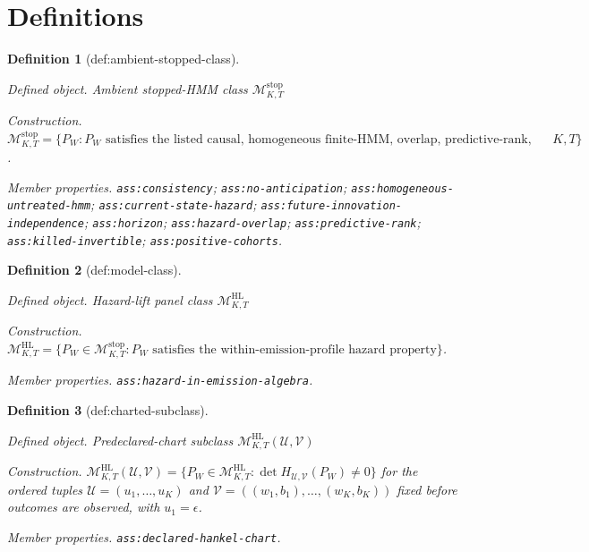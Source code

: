 \documentclass{article}
\newtheorem{definition}{Definition}
\begin{document}
\section{Definitions}

\begin{definition}[def:ambient-stopped-class]\label{def:ambient-stopped-class}
\par\smallskip\noindent\emph{Defined object.} Ambient stopped-HMM class \(\mathcal M^{\mathrm{stop}}_{K,T}\)
\par\smallskip\noindent\emph{Construction.} \(\mathcal M^{\mathrm{stop}}_{K,T}=\{P_W:P_W\text{ satisfies the listed causal, homogeneous finite-HMM, overlap, predictive-rank, killed-inverse, and cohort-support properties for the displayed }K,T\}\).
\par\smallskip\noindent\emph{Member properties.} \texttt{ass:\allowbreak{}consistency}; \texttt{ass:\allowbreak{}no-\allowbreak{}anticipation}; \texttt{ass:\allowbreak{}homogeneous-\allowbreak{}untreated-\allowbreak{}hmm}; \texttt{ass:\allowbreak{}current-\allowbreak{}state-\allowbreak{}hazard}; \texttt{ass:\allowbreak{}future-\allowbreak{}innovation-\allowbreak{}independence}; \texttt{ass:\allowbreak{}horizon}; \texttt{ass:\allowbreak{}hazard-\allowbreak{}overlap}; \texttt{ass:\allowbreak{}predictive-\allowbreak{}rank}; \texttt{ass:\allowbreak{}killed-\allowbreak{}invertible}; \texttt{ass:\allowbreak{}positive-\allowbreak{}cohorts}.
\end{definition}

\begin{definition}[def:model-class]\label{def:model-class}
\par\smallskip\noindent\emph{Defined object.} Hazard-lift panel class \(\mathcal M^{\mathrm{HL}}_{K,T}\)
\par\smallskip\noindent\emph{Construction.} \(\mathcal M^{\mathrm{HL}}_{K,T}=\{P_W\in\mathcal M^{\mathrm{stop}}_{K,T}:P_W\text{ satisfies the within-emission-profile hazard property}\}\).
\par\smallskip\noindent\emph{Member properties.} \texttt{ass:\allowbreak{}hazard-\allowbreak{}in-\allowbreak{}emission-\allowbreak{}algebra}.
\end{definition}

\begin{definition}[def:charted-subclass]\label{def:charted-subclass}
\par\smallskip\noindent\emph{Defined object.} Predeclared-chart subclass \(\mathcal M^{\mathrm{HL}}_{K,T}(\mathcal U,\mathcal V)\)
\par\smallskip\noindent\emph{Construction.} \(\mathcal M^{\mathrm{HL}}_{K,T}(\mathcal U,\mathcal V)=\{P_W\in\mathcal M^{\mathrm{HL}}_{K,T}:\det H_{\mathcal U,\mathcal V}(P_W)\ne0\}\) for the ordered tuples \(\mathcal U=(u_1,\ldots,u_K)\) and \(\mathcal V=((w_1,b_1),\ldots,(w_K,b_K))\) fixed before outcomes are observed, with \(u_1=\epsilon\).
\par\smallskip\noindent\emph{Member properties.} \texttt{ass:\allowbreak{}declared-\allowbreak{}hankel-\allowbreak{}chart}.
\end{definition}
\end{document}
